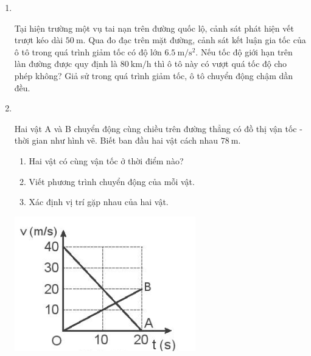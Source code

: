 \begin{enumerate}[label=\bfseries Bài \arabic*:]
\item{}\\
{Tại hiện trường một vụ tai nạn trên đường quốc lộ, cảnh sát phát hiện vết trượt kéo dài $\SI{50}{\meter}$. Qua đo đạc trên mặt đường, cảnh sát kết luận gia tốc của ô tô trong quá trình giảm tốc có độ lớn $\SI{6.5}{\meter/\second^2}$. Nếu tốc độ giới hạn trên làn đường được quy định là $\SI{80}{\kilo\meter/\hour}$ thì ô tô này có vượt quá tốc độ cho phép không? Giả sử trong quá trình giảm tốc, ô tô chuyển động chậm dần đều.

}


\item {}\\
{\begin{minipage}[l]{0.7\textwidth}
		Hai vật A và B chuyển động cùng chiều trên đường thẳng có đồ thị vận tốc - thời gian như hình vẽ. Biết ban đầu hai vật cách nhau $\SI{78}{\meter}$.
		\begin{enumerate}[label=\alph*)]
			\item Hai vật có cùng vận tốc ở thời điểm nào?
			\item Viết phương trình chuyển động của mỗi vật.
			\item Xác định vị trí gặp nhau của hai vật.
		\end{enumerate}
	\end{minipage}
\begin{minipage}{0.3\textwidth}
	\begin{center}
		\includegraphics[width=0.8\linewidth]{../figs/VN10-2023-PH-TP0003-10}
	\end{center}
\end{minipage}

}



\end{enumerate}
